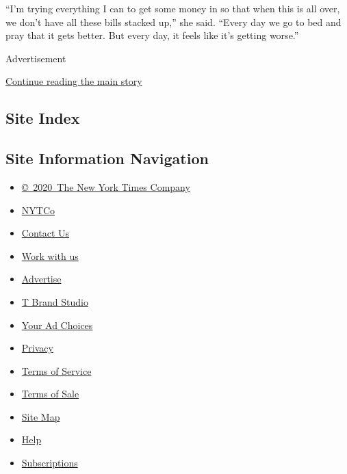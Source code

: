 ``I'm trying everything I can to get some money in so that when this is
all over, we don't have all these bills stacked up,'' she said. ``Every
day we go to bed and pray that it gets better. But every day, it feels
like it's getting worse.''

Advertisement

\protect\hyperlink{after-bottom}{Continue reading the main story}

\hypertarget{site-index}{%
\subsection{Site Index}\label{site-index}}

\hypertarget{site-information-navigation}{%
\subsection{Site Information
Navigation}\label{site-information-navigation}}

\begin{itemize}
\tightlist
\item
  \href{https://help.nytimes.com/hc/en-us/articles/115014792127-Copyright-notice}{©~2020~The
  New York Times Company}
\end{itemize}

\begin{itemize}
\tightlist
\item
  \href{https://www.nytco.com/}{NYTCo}
\item
  \href{https://help.nytimes.com/hc/en-us/articles/115015385887-Contact-Us}{Contact
  Us}
\item
  \href{https://www.nytco.com/careers/}{Work with us}
\item
  \href{https://nytmediakit.com/}{Advertise}
\item
  \href{http://www.tbrandstudio.com/}{T Brand Studio}
\item
  \href{https://www.nytimes.com/privacy/cookie-policy\#how-do-i-manage-trackers}{Your
  Ad Choices}
\item
  \href{https://www.nytimes.com/privacy}{Privacy}
\item
  \href{https://help.nytimes.com/hc/en-us/articles/115014893428-Terms-of-service}{Terms
  of Service}
\item
  \href{https://help.nytimes.com/hc/en-us/articles/115014893968-Terms-of-sale}{Terms
  of Sale}
\item
  \href{https://spiderbites.nytimes.com}{Site Map}
\item
  \href{https://help.nytimes.com/hc/en-us}{Help}
\item
  \href{https://www.nytimes.com/subscription?campaignId=37WXW}{Subscriptions}
\end{itemize}
